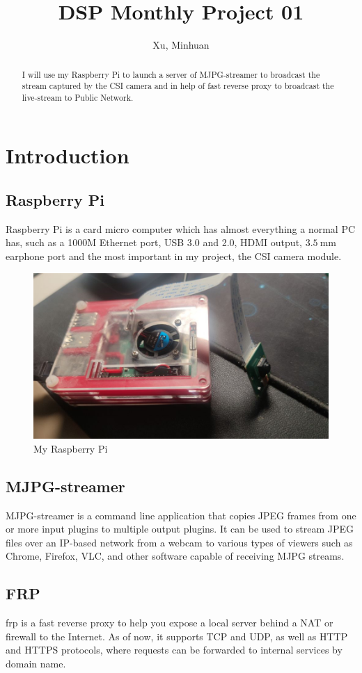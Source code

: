 \documentclass{article}
\begin{document}
\title{DSP Monthly Project 01}
\author{Xu, Minhuan}
\maketitle
\tableofcontents
\begin{abstract}
I will use my Raspberry Pi to launch a server of MJPG-streamer to broadcast the stream captured by the CSI camera and in help of fast reverse proxy to broadcast the live-stream to Public Network.
\end{abstract}

\section{Introduction}
\subsection{Raspberry Pi}
Raspberry Pi is a card micro computer which has almost everything a normal PC has, such as a 1000M Ethernet port, USB 3.0 and 2.0, HDMI output, $3.5 ~ \mathrm{mm}$ earphone port and the most important in my project, the CSI camera module.

\begin{figure}[!h]
	\centering
	\includegraphics[width=3 in]{../pic/raspi-photo.jpg}
	\caption{My Raspberry Pi}
	\label{fig:raspi-photo}
\end{figure}

\subsection{MJPG-streamer}
MJPG-streamer is a command line application that copies JPEG frames from one or more input plugins to multiple output plugins.  It can be used to stream JPEG files over an IP-based network from a webcam to various types of viewers such as Chrome, Firefox, VLC, and other software capable of receiving MJPG streams. \cite{gh:mjpg-streamer}

\subsection{FRP}
frp is a fast reverse proxy to help you expose a local server behind a NAT or firewall to the Internet.  As of now, it supports TCP and UDP, as well as HTTP and HTTPS protocols, where requests can be forwarded to internal services by domain name.\cite{gh:frp}
\end{document}
